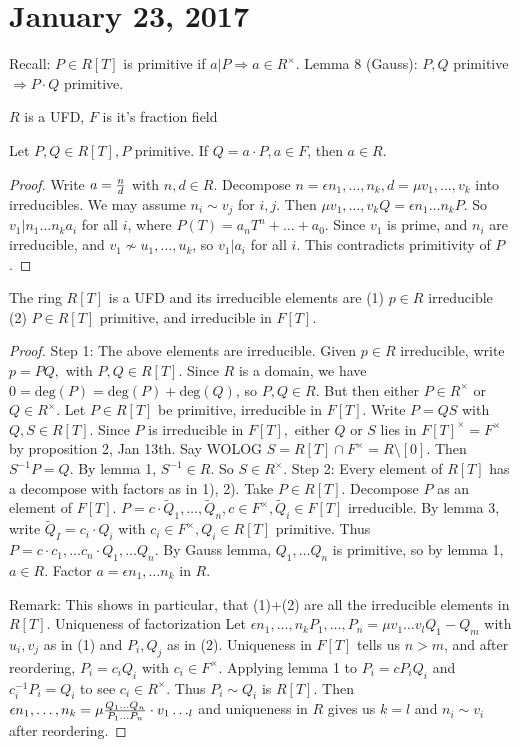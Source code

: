 \section{January 23, 2017}
Recall: $P\in R[T]$ is primitive if $a|P\Longrightarrow a\in R^{\times}$.
Lemma 8 (Gauss): $P,Q$ primitive $\Longrightarrow P\cdot Q$ primitive.

$R$ is a UFD, $F$ is it's fraction field
\begin{lemma}
    Let $P,Q\in R[T], P$ primitive. If $Q=a\cdot P, a\in F$, then $a\in R$.
\end{lemma}
\begin{proof}
    Write $a={n\over d}$ with $n,d\in R$. Decompose $n=\epsilon n_1,\ldots, n_k,d=\mu v_1,\ldots,v_k$ into irreducibles. We may assume $n_i\sim v_j$ for $i,j$. Then $\mu v_1,\ldots, v_kQ=\epsilon   n_1\ldots n_k P$. So $v_1|n_1\ldots n_ka_i$ for all $i$, where $P(T)=a_nT^n+\ldots+a_0$. Since $v_1$ is prime, and $n_i$ are irreducible, and $v_1\nsim u_1,\ldots, u_k$, so $v_1|a_i$ for all $i$. This contradicts primitivity of $P$. 
\end{proof}
\begin{thm}
    The ring $R[T]$ is a UFD and its irreducible elements are
    (1) $p\in R$ irreducible
    (2) $P\in R[T]$ primitive, and irreducible in $F[T]$.
\end{thm}
\begin{proof}
    Step 1: The above elements are irreducible. 
    Given $p\in R$ irreducible, write $p=PQ,$ with $P,Q\in R[T]$. Since $R$ is a domain, we have $0=\text{deg}(P)=\text{deg}(P)+\text{deg}(Q)$, so $P,Q\in R$. But then either $P\in R^{\times}$ or $Q\in R^{\times}.$
    Let $P\in R[T]$ be primitive, irreducible in $F[T]$. Write $P=QS$ with $Q,S\in R[T].$ Since $P$ is irreducible in $F[T],$ either $Q$ or $S$ lies in $F[T]^{\times}=F^{\times}$ by proposition 2, Jan 13th. Say WOLOG $S=R[T]\cap F^{\times}=R\setminus[0].$ Then $S^{-1}P=Q$. By lemma 1, $S^{-1}\in R.$ So $S\in R^{\times}.$ 
    Step 2: Every element of $R[T]$ has a decompose with factors as in 1), 2).
    Take $P\in R[T].$ Decompose $P$ as an element of $F[T]$. $P=c\cdot \tilde{Q}_1,\ldots,\tilde{Q}_n, c\in F^{\times}, \tilde{Q}_i\in F[T]$ irreducible. By lemma 3, write $\tilde{Q}_I=c_i\cdot Q_i$ with $c_i\in F^{\times}, Q_i\in R[T]$ primitive. Thus $P=c\cdot c_1,\ldots c_n\cdot Q_1,\ldots Q_n$. By Gauss lemma, $Q_1,\ldots Q_n$ is primitive, so by lemma 1, $a\in R$. Factor $a=\epsilon n_1,\ldots n_k$ in $R$. 
    
    Remark: This shows in particular, that (1)+(2) are all the irreducible elements in $R[T]$.
    Uniqueness of factorization
    Let $\epsilon n_1,\ldots, n_k P_1,\ldots, P_n= \mu v_1\ldots v_l Q_1-Q_m$ with $u_i,v_j$ as in (1) and $P_i,Q_j$ as in (2). Uniqueness in $F[T]$ tells us $n>m$, and after reordering, $P_i=c_iQ_i$ with $c_i\in F^{\times}$. Applying lemma 1 to $P_i=cP_iQ_i$ and $c_i^{-1}P_i=Q_i$ to see $c_i\in R^{\times}$. Thus $P_i\sim Q_i$ is $R[T]$. Then $\epsilon n_1,\ldots, n_k=\mu {Q_1\ldots Q_n\over P_1\ldots P_n}\cdot v_1\ldots _l$ and uniqueness in $R$ gives us $k=l$ and $n_i\sim v_i$ after reordering.
\end{proof}


